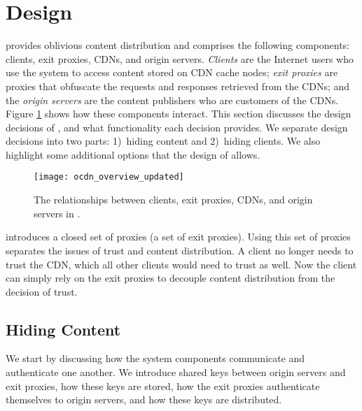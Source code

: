 \section{\system{} Design}
\label{sec:design}

\system{} provides oblivious content distribution and  
comprises the following components: clients, exit proxies, CDNs, and origin 
servers.  {\em Clients} are the Internet users who use the system to access content
stored on CDN cache nodes; {\em exit proxies} are proxies that obfuscate the requests
and responses retrieved from the CDNs; and the {\em origin servers} are the content
publishers who are customers of the CDNs.  Figure \ref{fig:ocd_overview} shows how
these components interact.  This section discusses the design decisions of \system{}, and what functionality each decision provides.  
We separate design decisions into two parts: 1)~hiding content and 2)~hiding clients.  We also highlight some additional options that the design of 
\system{} allows.

\begin{figure}[t!]
\centering
\texttt{[image: ocdn\_overview\_updated]}
\caption{The relationships between clients, exit proxies, CDNs, and origin servers in 
\system{}.}
\label{fig:ocd_overview}
\end{figure}

\system{} introduces a closed set of proxies (a set of exit proxies).  Using this set of proxies separates the issues of trust and content distribution.  A client no longer needs to trust the CDN, which all other clients would need to trust as well.  Now the client can simply rely on the exit proxies to decouple content distribution from the decision of trust.  

\subsection{Hiding Content}
\label{sec:hiding_content}

We start by discussing how the system components communicate and authenticate one another. 
We introduce shared keys between origin servers and exit proxies, how these keys
are stored, how the exit proxies authenticate themselves to origin servers, and how these 
keys are distributed.

